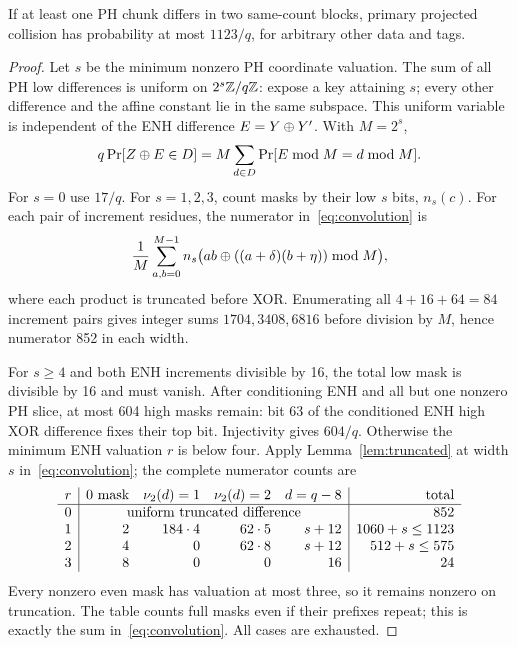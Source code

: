 \begin{theorem}[PH bound 1123]\label{thm:1123}
If at least one PH chunk differs in two same-count blocks, primary projected collision has probability at most $1123/q$, for arbitrary other data and tags.
\end{theorem}
\begin{proof}
Let $s$ be the minimum nonzero PH coordinate valuation. The sum of all PH low differences is uniform on $2^s\mathbb Z/q\mathbb Z$: expose a key attaining $s$; every other difference and the affine constant lie in the same subspace. This uniform variable is independent of the ENH difference $E=Y\mathbin\oplus Y'$. With $M=2^s$,
\begin{equation}\label{eq:convolution}
 q\mathop{\rm Pr}[Z\mathbin\oplus E\in D]=M\sum_{d\in D}\mathop{\rm Pr}[E\bmod M=d\bmod M].
\end{equation}
For $s=0$ use $17/q$. For $s=1,2,3$, count masks by their low $s$ bits, $n_s(c)$. For each pair of increment residues, the numerator in~\eqref{eq:convolution} is
\[
 \frac1M\sum_{a,b=0}^{M-1}n_s\bigl(ab\mathbin\oplus((a+\delta)(b+\eta))\bmod M\bigr),
\]
where each product is truncated before XOR. Enumerating all $4+16+64=84$ increment pairs gives integer sums $1704,3408,6816$ before division by $M$, hence numerator 852 in each width.

For $s\ge4$ and both ENH increments divisible by 16, the total low mask is divisible by 16 and must vanish. After conditioning ENH and all but one nonzero PH slice, at most 604 high masks remain: bit 63 of the conditioned ENH high XOR difference fixes their top bit. Injectivity gives $604/q$. Otherwise the minimum ENH valuation $r$ is below four. Apply Lemma~\ref{lem:truncated} at width $s$ in~\eqref{eq:convolution}; the complete numerator counts are
\[
\begin{array}{c|rrrr|r}
r&0\text{ mask}&\val(d)=1&\val(d)=2&d=q-8&\text{total}\\\hline
0&\multicolumn{4}{c|}{\text{uniform truncated difference}}&852\\
1&2&184\cdot4&62\cdot5&s+12&1060+s\le1123\\
2&4&0&62\cdot8&s+12&512+s\le575\\
3&8&0&0&16&24
\end{array}
\]
Every nonzero even mask has valuation at most three, so it remains nonzero on truncation. The table counts full masks even if their prefixes repeat; this is exactly the sum in~\eqref{eq:convolution}. All cases are exhausted.
\end{proof}

